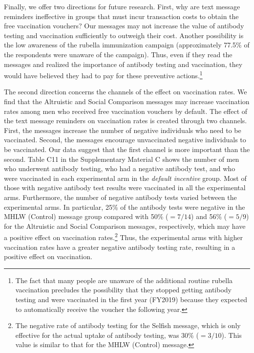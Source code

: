 \documentclass[
      12pt,
    a4paper
]{article}
\begin{document}
Finally, we offer two directions for future research. First, why are text message reminders ineffective in groups that must incur transaction costs to obtain the free vaccination vouchers? Our messages may not increase the value of antibody testing and vaccination sufficiently to outweigh their cost. Another possibility is the low awareness of the rubella immunization campaign (approximately 77.5\% of the respondents were unaware of the campaign). Thus, even if they read the messages and realized the importance of antibody testing and vaccination, they would have believed they had to pay for these preventive actions.\footnote{The fact that many people are unaware of the additional routine rubella vaccination precludes the possibility that they stopped getting antibody testing and were vaccinated in the first year (FY2019) because they expected to automatically receive the voucher the following year.}

The second direction concerns the channels of the effect on vaccination rates. We find that the Altruistic and Social Comparison messages may increase vaccination rates among men who received free vaccination vouchers by default. The effect of the text message reminders on vaccination rates is created through two channels. First, the messages increase the number of negative individuals who need to be vaccinated. Second, the messages encourage unvaccinated negative individuals to be vaccinated. Our data suggest that the first channel is more important than the second. Table C11 in the Supplementary Material C shows the number of men who underwent antibody testing, who had a negative antibody test, and who were vaccinated in each experimental arm in the \emph{default incentive} group. Most of those with negative antibody test results were vaccinated in all the experimental arms. Furthermore, the number of negative antibody tests varied between the experimental arms. In particular, 25\% of the antibody tests were negative in the MHLW (Control) message group compared with 50\% (\(=7/14\)) and 56\% (\(=5/9\)) for the Altruistic and Social Comparison messages, respectively, which may have a positive effect on vaccination rates.\footnote{The negative rate of antibody testing for the Selfish message, which is only effective for the actual uptake of antibody testing, was 30\% (\(=3/10\)). This value is similar to that for the MHLW (Control) message.} Thus, the experimental arms with higher vaccination rates have a greater negative antibody testing rate, resulting in a positive effect on vaccination.
\end{document}
